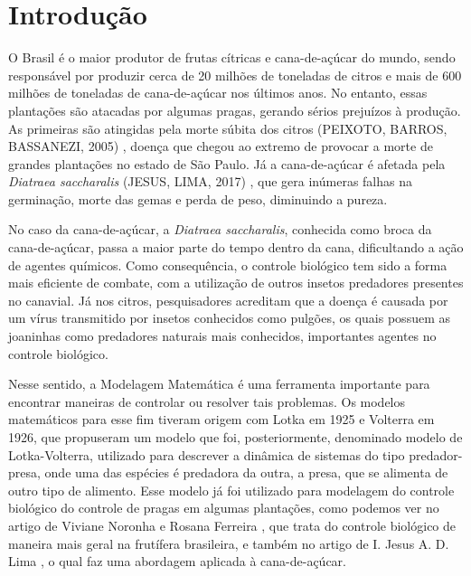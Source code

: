 \maketitle

\section{Introdução}

O Brasil é o maior produtor de frutas cítricas e cana-de-açúcar do mundo, sendo responsável por produzir cerca de 20 milhões de toneladas de citros e mais de 600 milhões de toneladas de cana-de-açúcar nos últimos anos. No entanto, essas plantações são atacadas por algumas pragas, gerando sérios prejuízos à produção. As primeiras são atingidas pela morte súbita dos citros (PEIXOTO,
BARROS, BASSANEZI, 2005) \cite{mp_lb_rb_2005}, doença que chegou ao extremo de provocar a morte de grandes plantações no estado de São Paulo. Já a cana-de-açúcar é afetada pela \textit{Diatraea saccharalis} (JESUS, LIMA, 2017) \cite{ij_al_2017}, que gera inúmeras falhas na germinação, morte das gemas e perda de peso, diminuindo a pureza.

No caso da cana-de-açúcar, a \textit{Diatraea saccharalis}, conhecida como broca da cana-de-açúcar, passa a maior parte do tempo dentro da cana, dificultando a ação de agentes químicos. Como consequência, o controle biológico tem sido a forma mais eficiente de combate, com a utilização de outros insetos predadores presentes no canavial. Já nos citros, pesquisadores acreditam que a doença é causada por um vírus transmitido por insetos conhecidos como pulgões, os quais possuem as joaninhas como predadores naturais mais conhecidos, importantes agentes no controle biológico.

Nesse sentido, a Modelagem Matemática é uma ferramenta importante para encontrar maneiras de controlar ou resolver tais problemas. Os modelos matemáticos para esse fim tiveram origem com Lotka em 1925 e Volterra em 1926, que propuseram um modelo que foi, posteriormente, denominado modelo de Lotka-Volterra, utilizado para descrever a dinâmica de sistemas do tipo predador-presa, onde uma das espécies é predadora da outra, a presa, que se alimenta de outro tipo de alimento. Esse modelo já foi utilizado para modelagem do controle biológico do controle de pragas em algumas plantações, como podemos ver no artigo de Viviane Noronha e Rosana Ferreira \cite{vn_rf_2021}, que trata do controle biológico de maneira mais geral na frutífera brasileira, e também no artigo de I. Jesus  A. D. Lima \cite{ij_al_2017}, o qual faz uma abordagem aplicada à cana-de-açúcar.

